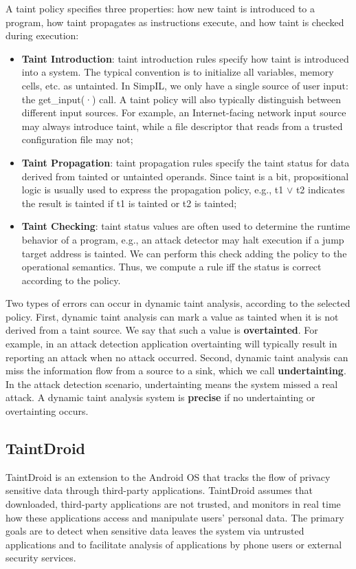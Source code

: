 A taint policy specifies three properties: how new taint is introduced to a program, how taint propagates as instructions execute, and how taint is checked during execution:
\begin{itemize}
	\item \textbf{Taint Introduction}: taint introduction rules specify how taint is introduced into a system. The typical convention is to initialize all variables, memory cells, etc. as untainted. In SimpIL, we only have a single source of user input: the get\_input(·) call. A taint policy will also typically distinguish between different input sources. For example, an Internet-facing network input source may always introduce taint, while a file descriptor that reads from a trusted configuration file may not;
	\item \textbf{Taint Propagation}: taint propagation rules specify the taint status for data derived from tainted or untainted operands. Since taint is a bit, propositional logic is usually used to express the propagation policy, e.g., t1 $\lor$ t2 indicates the result is tainted if t1 is tainted or t2 is tainted;
	\item \textbf{Taint Checking}: taint status values are often used to determine the runtime behavior of a program, e.g., an attack detector may halt execution if a jump target address is tainted. We can perform this check adding the policy to the operational semantics. Thus, we compute a rule iff the status is correct according to the policy.
\end{itemize}

Two types of errors can occur in dynamic taint analysis, according to the selected policy. First, dynamic taint analysis can mark a value as tainted when it is not derived from a taint source. We say that such a value is \textbf{overtainted}. For example, in an attack detection application overtainting will typically result in reporting an attack when no attack occurred. Second, dynamic taint analysis can miss the information flow from a source to a sink, which we call \textbf{undertainting}. In the attack detection scenario, undertainting means the system missed a real attack. A dynamic taint analysis system is \textbf{precise} if no undertainting or overtainting occurs.

\subsection{TaintDroid}
TaintDroid is an extension to the Android OS that tracks the flow of privacy sensitive data through third-party applications. TaintDroid assumes that downloaded, third-party applications are not trusted, and monitors in real time how these applications access and manipulate users' personal data. The primary goals are to detect when sensitive data leaves the system via untrusted applications and to facilitate analysis of applications by phone users or external security services.

